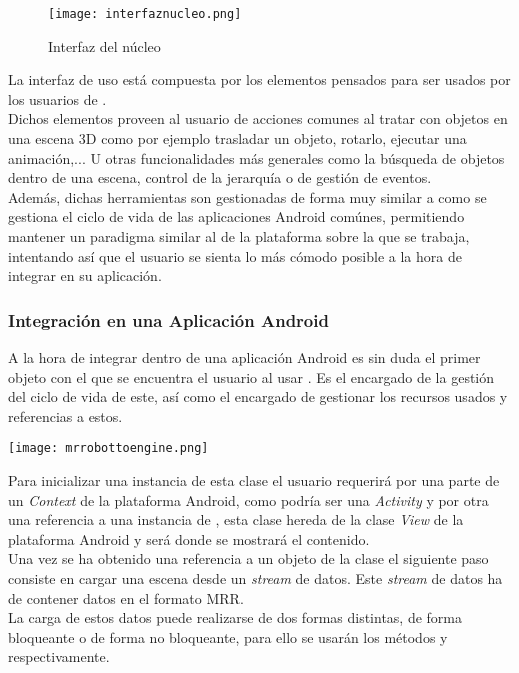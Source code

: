 \begin{figure}[h!]
\begin{center}
\texttt{[image: interfaznucleo.png]}
\end{center}
\caption[Interfaz del núcleo]{Interfaz del núcleo}
\label{fig:interfaznucleo}
\end{figure}

La interfaz de uso está compuesta por los elementos pensados para ser usados por los usuarios de \robotto.\\
Dichos elementos proveen al usuario de acciones comunes al tratar con objetos en una escena 3D como por ejemplo trasladar un objeto, rotarlo, ejecutar una animación,... U otras funcionalidades más generales como la búsqueda de objetos dentro de una escena, control de la jerarquía o de gestión de eventos.\\
Además, dichas herramientas son gestionadas de forma muy similar a como se gestiona el ciclo de vida de las aplicaciones Android comúnes, permitiendo mantener un paradigma similar al de la plataforma sobre la que se trabaja, intentando así que el usuario se sienta lo más cómodo posible a la hora de integrar \robotto en su aplicación.\\

\subsubsection{Integración en una Aplicación Android}

A la hora de integrar \robotto dentro de una aplicación Android \rorefrobottoengine\label{ro:robottoengine} es sin duda el primer objeto con el que se encuentra el usuario al usar \robotto. Es el encargado de la gestión del ciclo de vida de este, así como el encargado de gestionar los recursos usados y referencias a estos.\\
\begin{center}
\texttt{[image: mrrobottoengine.png]}
\end{center}

Para inicializar una instancia de esta clase el usuario requerirá por una parte de un \textit{Context} de la plataforma Android, como podría ser una \textit{Activity} y por otra una referencia a una instancia de \rorefsurfaceview\label{ro:surfaceview}, esta clase hereda de la clase \textit{View} de la plataforma Android y será donde se mostrará el contenido.\\

Una vez se ha obtenido una referencia a un objeto de la clase \rorefrobottoengine el siguiente paso consiste en cargar una escena desde un \textit{stream} de datos. Este \textit{stream} de datos ha de contener datos en el formato MRR.\\
La carga de estos datos puede realizarse de dos formas distintas, de forma bloqueante o de forma no bloqueante, para ello se usarán los métodos  y  respectivamente.\\

